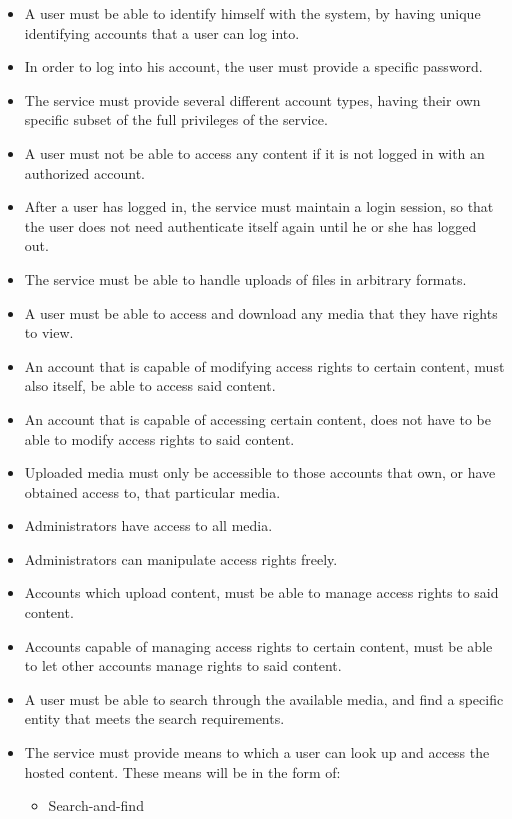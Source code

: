 \documentclass[10pt,a4paper]{article}
\begin{document}
\begin{itemize}
\item A user must be able to identify himself with the system, by having unique identifying accounts that a user can log into.
\item In order to log into his account, the user must provide a specific password.
\item The service must provide several different account types, having their own specific subset of the full privileges of the service.
\item A user must not be able to access any content if it is not logged in with an authorized account.
\item After a user has logged in, the service must maintain a login session, so that the user does not need authenticate itself again until he or she has logged out.
\item The service must be able to handle uploads of files in arbitrary formats.
\item A user must be able to access and download any media that they have rights to view.
\item An account that is capable of modifying access rights to certain content, must also itself, be able to access said content.
\item An account that is capable of accessing certain content, does not have to be able to modify access rights to said content.
\item Uploaded media must only be accessible to those accounts that own, or have obtained access to, that particular media.
\item Administrators have access to all media.
\item Administrators can manipulate access rights freely.
\item Accounts which upload content, must be able to manage access rights to said content.
\item Accounts capable of managing access rights to certain content, must be able to let other accounts manage rights to said content.
\item A user must be able to search through the available media, and find a specific entity that meets the search requirements.
\item The service must provide means to which a user can look up and access the hosted content. These means will be in the form of:
\begin{itemize}
\item Search-and-find
\begin{itemize}

\end{itemize}
\end{itemize}
\end{itemize}
\end{document}
